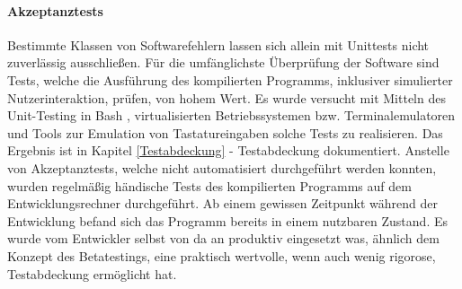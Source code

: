\paragraph{Akzeptanztests}
Bestimmte Klassen von Softwarefehlern lassen sich allein mit Unittests nicht
zuverlässig ausschließen. Für die umfänglichste Überprüfung der Software sind
Tests, welche die Ausführung des kompilierten Programms, inklusiver simulierter
Nutzerinteraktion, prüfen, von hohem Wert. Es wurde versucht mit Mitteln des
Unit-Testing in Bash \cite{bats}, virtualisierten Betriebssystemen \cite{virtualbox} \cite{docker}
bzw. \gls{Terminalemulator}en und Tools zur Emulation von Tastatureingaben \cite{xdotool} \cite{ydotool}
solche Tests zu realisieren. Das Ergebnis ist in Kapitel
\ref{Testabdeckung} - Testabdeckung dokumentiert. Anstelle von Akzeptanztests,
welche nicht automatisiert durchgeführt werden konnten, wurden regelmäßig händische
Tests des kompilierten Programms auf dem Entwicklungsrechner durchgeführt. Ab einem
gewissen Zeitpunkt während der Entwicklung befand sich das Programm bereits in einem nutzbaren
Zustand. Es wurde vom Entwickler selbst von da an produktiv eingesetzt was,
ähnlich dem Konzept des \gls{Betatesting}s, eine praktisch wertvolle, wenn auch wenig rigorose,
Testabdeckung ermöglicht hat.